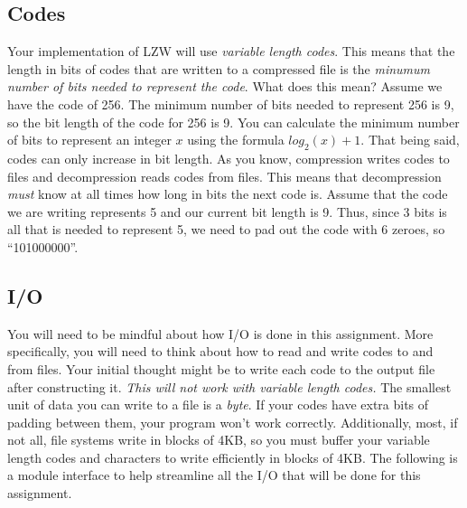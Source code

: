 \documentclass{article}
\begin{document}
\subsection{Codes}
Your implementation of LZW will use \emph{variable length codes}. This means
that the length in bits of codes that are written to a compressed file is the
\emph{minumum number of bits needed to represent the code}. What does this mean?
Assume we have the code of 256. The minimum number of bits needed to represent
256 is 9, so the bit length of the code for 256 is 9. You can calculate the
minimum number of bits to represent an integer $x$ using the formula $log_2(x) +
1$. That being said, codes can only increase in bit length. As you know,
compression writes codes to files and decompression reads codes from files. This
means that decompression \emph{must} know at all times how long in bits the next
code is. Assume that the code we are writing represents 5 and our current bit
length is 9. Thus, since 3 bits is all that is needed to represent 5, we need to
pad out the code with 6 zeroes, so ``101000000''.

\subsection{I/O}

You will need to be mindful about how I/O is done in this assignment. More
specifically, you will need to think about how to read and write codes to and
from files. Your initial thought might be to write each code to the output file
after constructing it. \emph{This will not work with variable length codes.} The
smallest unit of data you can write to a file is a \emph{byte}. If your codes
have extra bits of padding between them, your program won't work correctly.
Additionally, most, if not all, file systems write in blocks of 4KB, so you must
buffer your variable length codes and characters to write efficiently in blocks
of 4KB. The following is a module interface to help streamline all the I/O that
will be done for this assignment.
\end{document}
